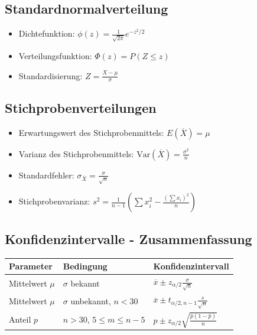 \documentclass[12pt, a4paper, titlepage, ngerman]{scrartcl}
\begin{document}
\subsection{Standardnormalverteilung}

\begin{itemize}
  \item Dichtefunktion: $\phi(z) = \frac{1}{\sqrt{2\pi}} e^{-z^2/2}$
  \item Verteilungsfunktion: $\Phi(z) = P(Z \leq z)$
  \item Standardisierung: $Z = \frac{X - \mu}{\sigma}$
\end{itemize}

\subsection{Stichprobenverteilungen}

\begin{itemize}
  \item Erwartungswert des Stichprobenmittels: $E(\overline{X}) = \mu$
  \item Varianz des Stichprobenmittels: $\text{Var}(\overline{X}) = \frac{\sigma^2}{n}$
  \item Standardfehler: $\sigma_{\overline{X}} = \frac{\sigma}{\sqrt{n}}$
  \item Stichprobenvarianz: $s^2 = \frac{1}{n-1} \left(\sum x_i^2 - \frac{(\sum x_i)^2}{n}\right)$
\end{itemize}

\subsection{Konfidenzintervalle - Zusammenfassung}

\begin{table}[h]
  \centering
  \begin{tabular}{lll}
    \toprule
    \textbf{Parameter} & \textbf{Bedingung} & \textbf{Konfidenzintervall} \\
    \midrule
    Mittelwert $\mu$ & $\sigma$ bekannt & $\overline{x} \pm z_{\alpha/2} \frac{\sigma}{\sqrt{n}}$ \\
    Mittelwert $\mu$ & $\sigma$ unbekannt, $n < 30$ & $\overline{x} \pm t_{\alpha/2, n-1} \frac{s}{\sqrt{n}}$ \\
    Anteil $p$ & $n > 30$, $5 \leq m \leq n-5$ & $\hat{p} \pm z_{\alpha/2} \sqrt{\frac{\hat{p}(1-\hat{p})}{n}}$ \\
    \bottomrule
  \end{tabular}
\end{table}
\end{document}
